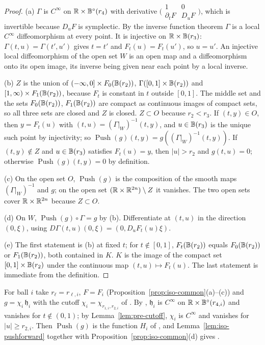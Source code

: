 \begin{proof}
(a) $\Gamma$ is $C^\infty$ on $\mathbb{R}\times\mathbb{B}^\circ(r_4)$ with derivative
$\bigl(\begin{smallmatrix}1&0\\\partial_tF&D_uF\end{smallmatrix}\bigr)$, which is invertible because $D_uF$ is symplectic. By the inverse
function theorem $\Gamma$ is a local $C^\infty$ diffeomorphism at every point. It is injective on $\mathbb{R}\times\mathbb{B}(r_3)$: $\Gamma(t,u)=\Gamma(t',u')$
gives $t=t'$ and $F_t(u)=F_t(u')$, so $u=u'$. An injective local diffeomorphism of the open set $W$ is an open map and a
diffeomorphism onto its open image, its inverse being given near each point by a local inverse.

(b) $Z$ is the union of $(-\infty,0]\times F_0(\mathbb{B}(r_2))$, $\Gamma([0,1]\times\mathbb{B}(r_2))$ and $[1,\infty)\times F_1(\mathbb{B}(r_2))$,
because $F_t$ is constant in $t$ outside $[0,1]$. The middle set and the sets $F_0(\mathbb{B}(r_2))$, $F_1(\mathbb{B}(r_2))$ are compact as
continuous images of compact sets, so all three sets are closed and $Z$ is closed. $Z\subset O$ because $r_2<r_3$. If
$(t,y)\in O$, then $y=F_t(u)$ with $(t,u)=(\Gamma|_W)^{-1}(t,y)$, and $u\in\mathbb{B}(r_3)$ is the unique such point by injectivity; so
$\operatorname{Push}(g)(t,y)=g((\Gamma|_W)^{-1}(t,y))$. If $(t,y)\notin Z$ and $u\in\mathbb{B}(r_3)$ satisfies $F_t(u)=y$, then $|u|>r_2$
and $g(t,u)=0$; otherwise $\operatorname{Push}(g)(t,y)=0$ by definition.

(c) On the open set $O$, $\operatorname{Push}(g)$ is the composition of the smooth maps $(\Gamma|_W)^{-1}$ and $g$; on the open set
$(\mathbb{R}\times\mathbb{R}^{2n})\setminus Z$ it vanishes. The two open sets cover $\mathbb{R}\times\mathbb{R}^{2n}$ because $Z\subset O$.

(d) On $W$, $\operatorname{Push}(g)\circ\Gamma=g$ by (b). Differentiate at $(t,u)$ in the direction $(0,\xi)$, using
$D\Gamma(t,u)(0,\xi)=(0,D_uF_t(u)\xi)$.

(e) The first statement is (b) at fixed $t$; for $t\notin[0,1]$, $F_t(\mathbb{B}(r_2))$ equals $F_0(\mathbb{B}(r_2))$ or $F_1(\mathbb{B}(r_2))$,
both contained in $K$. $K$ is the image of the compact set $[0,1]\times\mathbb{B}(r_2)$ under the continuous map $(t,u)\mapsto F_t(u)$. The
last statement is immediate from the definition.
\end{proof}

For ball $i$ take $r_\ell=r_{\ell,i}$, $F=F_i$ (Proposition~\ref{prop:iso-common}(a)--(c)) and $g=\chi_i\,\mathfrak h_i$ with the
cutoff $\chi_i=\chi_{r_{1,i},r_{2,i}}$ of . By , $\mathfrak h_i$ is $C^\infty$ on
$\mathbb{R}\times\mathbb{B}^\circ(r_{4,i})$ and vanishes for $t\notin(0,1)$; by Lemma~\ref{lem:pre-cutoff}, $\chi_i$ is $C^\infty$ and vanishes for
$|u|\ge r_{2,i}$. Then $\operatorname{Push}(g)$ is the function $H_i$ of , and
Lemma~\ref{lem:iso-pushforward} together with Proposition~\ref{prop:iso-common}(d) gives .
